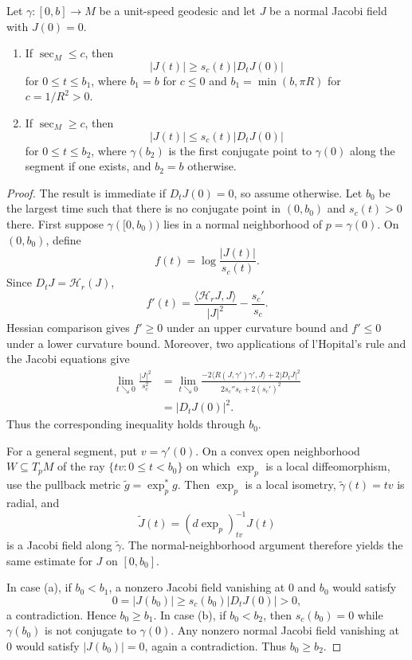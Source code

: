 \begin{theorem}
\label{thm:jacobi-field-comparison}

Let $\gamma\colon[0,b]\to M$ be a unit-speed geodesic and let $J$ be a normal
Jacobi field with $J(0)=0$.
\begin{enumerate}
\item[(a)] If $\sec_M\leq c$, then
\begin{equation}
|J(t)|\geq s_c(t)|D_tJ(0)| \tag{11.21}
\end{equation}
for $0\leq t\leq b_1$, where $b_1=b$ for $c\leq0$ and
$b_1=\min(b,\pi R)$ for $c=1/R^2>0$.
\item[(b)] If $\sec_M\geq c$, then
\begin{equation}
|J(t)|\leq s_c(t)|D_tJ(0)| \tag{11.22}
\end{equation}
for $0\leq t\leq b_2$, where $\gamma(b_2)$ is the first conjugate point to
$\gamma(0)$ along the segment if one exists, and $b_2=b$ otherwise.
\end{enumerate}
\end{theorem}

\begin{proof}
\sketch The result is immediate if $D_tJ(0)=0$, so assume otherwise. Let
$b_0$ be the largest time such that there is no conjugate point in $(0,b_0)$
and $s_c(t)>0$ there. First suppose $\gamma([0,b_0))$ lies in a normal
neighborhood of $p=\gamma(0)$. On $(0,b_0)$, define
\[
f(t)=\log\frac{|J(t)|}{s_c(t)}.
\]
Since $D_tJ=\mathcal H_r(J)$,
\[
f'(t)
=\frac{\langle\mathcal H_rJ,J\rangle}{|J|^2}
-\frac{s_c'}{s_c}.
\]
Hessian comparison gives $f'\geq0$ under an upper curvature bound and
$f'\leq0$ under a lower curvature bound. Moreover, two applications of
l'Hopital's rule and the Jacobi equations give
\begin{align*}
\lim_{t\searrow0}\frac{|J|^2}{s_c^2}
&=\lim_{t\searrow0}
\frac{-2\langle R(J,\gamma')\gamma',J\rangle+2|D_tJ|^2}
{2s_c''s_c+2(s_c')^2}\\
&=|D_tJ(0)|^2.
\end{align*}
Thus the corresponding inequality holds through $b_0$.

For a general segment, put $v=\gamma'(0)$. On a convex open neighborhood
$W\subseteq T_pM$ of the ray $\{tv:0\leq t<b_0\}$ on which $\exp_p$ is a
local diffeomorphism, use the pullback metric
$\widetilde g=\exp_p^*g$. Then $\exp_p$ is a local isometry,
$\widetilde\gamma(t)=tv$ is radial, and
\[
\widetilde J(t)=(d\exp_p)_{tv}^{-1}J(t)
\]
is a Jacobi field along $\widetilde\gamma$. The normal-neighborhood argument
therefore yields the same estimate for $J$ on $[0,b_0]$.

In case (a), if $b_0<b_1$, a nonzero Jacobi field vanishing at $0$ and $b_0$
would satisfy
\[
0=|J(b_0)|\geq s_c(b_0)|D_tJ(0)|>0,
\]
a contradiction. Hence $b_0\geq b_1$. In case (b), if $b_0<b_2$, then
$s_c(b_0)=0$ while $\gamma(b_0)$ is not conjugate to $\gamma(0)$. Any nonzero
normal Jacobi field vanishing at $0$ would satisfy $|J(b_0)|=0$, again a
contradiction. Thus $b_0\geq b_2$.
\end{proof}

